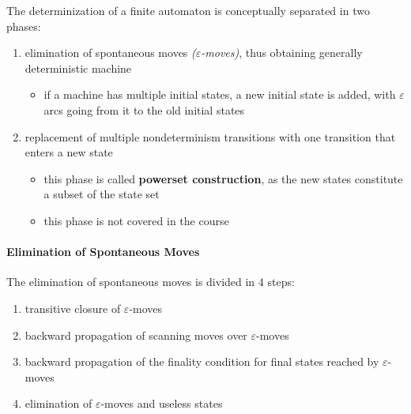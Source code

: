 \documentclass[english]{article}
\begin{document}
The determinization of a finite automaton is conceptually separated in two phases:

\begin{enumerate}
  \item elimination of spontaneous moves \textit{(\(\varepsilon\)-moves)}, thus obtaining generally deterministic machine
        \begin{itemize}[label=\(\rightarrow\)]
          \item if a machine has multiple initial states, a new initial state is added, with \(\varepsilon\) arcs going from it to the old initial states
        \end{itemize}
  \item replacement of multiple nondeterminism transitions with one transition that enters a new state
        \begin{itemize}[label=\(\rightarrow\)]
          \item this phase is called \textbf{powerset construction}, as the new states constitute a subset of the state set
          \item this phase is not covered in the course
        \end{itemize}
\end{enumerate}

\paragraph{Elimination of Spontaneous Moves}

The elimination of spontaneous moves is divided in \(4\) steps:

\begin{enumerate}
  \item transitive closure of \(\varepsilon\)-moves
        \begin{figure}[h]
          \centering
          
        \end{figure}
  \item backward propagation of scanning moves over \(\varepsilon\)-moves
        \begin{figure}[h]
          \centering
          
        \end{figure}
  \item backward propagation of the finality condition for final states reached by \(\varepsilon\)-moves
        \begin{figure}[h]
          \centering
          
        \end{figure}
  \item elimination of \(\varepsilon\)-moves and useless states
\end{enumerate}
\end{document}
